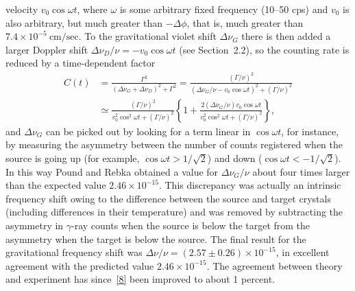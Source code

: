 velocity $v_0\cos\omega t$, where $\omega$ is some arbitrary fixed frequency
(10--50 cps) and $v_0$ is also arbitrary, but much greater than
$-\Delta\phi$, that is, much greater than
$7.4\times10^{-5}\ \mathrm{cm/sec}$. To the gravitational violet shift
$\Delta\nu_G$ there is then added a larger Doppler shift
$\Delta\nu_D/\nu=-v_0\cos\omega t$ (see Section~2.2), so the counting rate
is reduced by a time-dependent factor
\begin{align*}
  C(t)
  &=\frac{\Gamma^2}{(\Delta\nu_G+\Delta\nu_D)^2+\Gamma^2}
  =
  \frac{(\Gamma/\nu)^2}
  {(\Delta\nu_G/\nu-v_0\cos\omega t)^2+(\Gamma/\nu)^2}
  \\
  &\simeq
  \frac{(\Gamma/\nu)^2}
  {v_0^2\cos^2\omega t+(\Gamma/\nu)^2}
  \left\{1+
  \frac{2(\Delta\nu_G/\nu)v_0\cos\omega t}
  {v_0^2\cos^2\omega t+(\Gamma/\nu)^2}\right\},
\end{align*}
and $\Delta\nu_G$ can be picked out by looking for a term linear in
$\cos\omega t$, for instance, by measuring the asymmetry between the number
of counts registered when the source is going up (for example,
$\cos\omega t>1/\sqrt2$) and down ($\cos\omega t<-1/\sqrt2$). In this way
Pound and Rebka obtained a value for $\Delta\nu_G/\nu$ about four times
larger than the expected value $2.46\times10^{-15}$. This discrepancy was
actually an intrinsic frequency shift owing to the difference between the
source and target crystals (including differences in their temperature) and
was removed by subtracting the asymmetry in $\gamma$-ray counts when the
source is below the target from the asymmetry when the target is below the
source. The final result for the gravitational frequency shift was
$\Delta\nu/\nu=(2.57\pm0.26)\times10^{-15}$, in excellent agreement with
the predicted value $2.46\times10^{-15}$. The agreement between theory and
experiment has since~\hyperref[ch3-ref-8]{[8]} been improved to about 1
percent.

